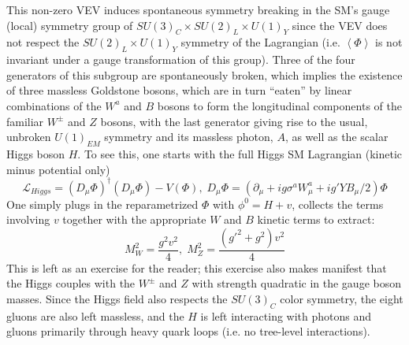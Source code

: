 This non-zero VEV induces spontaneous symmetry breaking in the SM's gauge (local) symmetry group of $SU\left(3\right)_C\times SU\left(2\right)_L\times U\left(1\right)_Y$ since the VEV does not respect the $SU\left(2\right)_L\times U\left(1\right)_Y$ symmetry of the Lagrangian (i.e. $\left<\Phi\right>$ is not invariant under a gauge transformation of this group).  Three of the four generators of this subgroup are spontaneously broken, which implies the existence of three massless Goldstone bosons, which are in turn ``eaten'' by linear combinations of the $W^a$ and $B$ bosons to form the longitudinal components of the familiar $W^{\pm}$ and $Z$ bosons, with the last generator giving rise to the usual, unbroken $U\left(1\right)_{EM}$ symmetry and its massless photon, $A$, as well as the scalar Higgs boson $H$.  To see this, one starts with the full Higgs SM Lagrangian (kinetic minus potential only)
\begin{equation}
\mathcal{L}_{Higgs}=\left(D_{\mu}\Phi\right)^\dagger\left(D_{\mu}\Phi\right)-V\left(\Phi\right),\; D_{\mu}\Phi = \left(\partial_{\mu}+ig\sigma^a W^a_\mu + ig'YB_\mu/2\right)\Phi
\end{equation}
One simply plugs in the reparametrized $\Phi$ with $\phi^0=H+v$, collects the terms involving $v$ together with the appropriate $W$ and $B$ kinetic terms to extract:
\begin{equation}
M_W^2=\frac{g^2v^2}{4},\;M_Z^2=\frac{\left(g'^2+g^2\right)v^2}{4}
\end{equation}
This is left as an exercise for the reader; this exercise also makes manifest that the Higgs couples with the $W^\pm$ and $Z$ with strength quadratic in the gauge boson masses.  Since the Higgs field also respects the $SU\left(3\right)_C$ color symmetry, the eight gluons are also left massless, and the $H$ is left interacting with photons and gluons primarily through heavy quark loops (i.e. no tree-level interactions).

